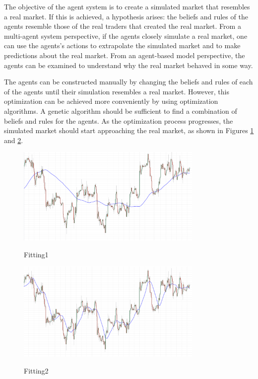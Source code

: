 \documentclass[review]{elsarticle}
\begin{document}
The objective of the agent system is to create a simulated market that resembles a real market. If this is achieved, a hypothesis arises: the beliefs and rules of the agents resemble those of the real traders that created the real market. From a multi-agent system perspective, if the agents closely simulate a real market, one can use the agents's actions to extrapolate the simulated market and to make predictions about the real market. From an agent-based model perspective, the agents can be examined to understand why the real market behaved in some way.

The agents can be constructed manually by changing the beliefs and rules of each of the agents until their simulation resembles a real market. However, this optimization can be achieved more conveniently by using optimization algorithms. A genetic algorithm should be sufficient to find a combination of beliefs and rules for the agents. As the optimization process progresses, the simulated market should start approaching the real market, as shown in Figures \ref{figure:fitting1} and \ref{figure:fitting2}.

\begin{figure}
\caption{Fitting1}
\centering
\includegraphics[width=0.8\textwidth]{img/fitting1.png}
\label{figure:fitting1}
\end{figure}

\begin{figure}
\caption{Fitting2}
\centering
\includegraphics[width=0.8\textwidth]{img/fitting2.png}
\label{figure:fitting2}
\end{figure}
\end{document}
